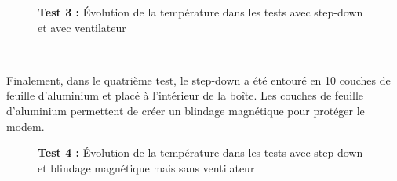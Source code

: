 \begin{figure}[ht!]
  \centering
  
  \label{fig:test_3}
  \vspace{-1cm}
  \caption{\textbf{Test 3 :} Évolution de la température dans les tests avec step-down et avec ventilateur}
\end{figure}

~

\noindent
Finalement, dans le quatrième test, le step-down a été entouré en 10 couches de feuille d'aluminium et placé à l'intérieur de la boîte. Les couches de feuille d'aluminium permettent de créer un blindage magnétique pour protéger le modem.


\begin{figure}[h!]
  \centering
  
  \label{fig:test_4}
  \vspace{-0.2cm}
  \caption{\textbf{Test 4 :} Évolution de la température dans les tests avec step-down et blindage magnétique mais sans ventilateur}
\end{figure}


